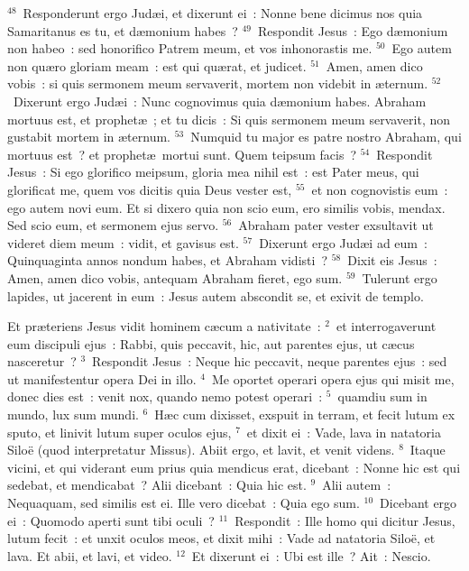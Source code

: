 ${}^{48}$~Responderunt ergo Jud\ae i, et dixerunt ei~: Nonne bene dicimus nos quia Samaritanus es tu, et d\ae monium habes~?
${}^{49}$~Respondit Jesus~: Ego d\ae monium non habeo~: sed honorifico Patrem meum, et vos inhonorastis me.
${}^{50}$~Ego autem non qu\ae ro gloriam meam~: est qui qu\ae rat, et judicet.
${}^{51}$~Amen, amen dico vobis~: si quis sermonem meum servaverit, mortem non videbit in \ae ternum.
${}^{52}$~Dixerunt ergo Jud\ae i~: Nunc cognovimus quia d\ae monium habes. Abraham mortuus est, et prophet\ae~; et tu dicis~: Si quis sermonem meum servaverit, non gustabit mortem in \ae ternum.
${}^{53}$~Numquid tu major es patre nostro Abraham, qui mortuus est~? et prophet\ae\ mortui sunt. Quem teipsum facis~?
${}^{54}$~Respondit Jesus~: Si ego glorifico meipsum, gloria mea nihil est~: est Pater meus, qui glorificat me, quem vos dicitis quia Deus vester est,
${}^{55}$~et non cognovistis eum~: ego autem novi eum. Et si dixero quia non scio eum, ero similis vobis, mendax. Sed scio eum, et sermonem ejus servo.
${}^{56}$~Abraham pater vester exsultavit ut videret diem meum~: vidit, et gavisus est.
${}^{57}$~Dixerunt ergo Jud\ae i ad eum~: Quinquaginta annos nondum habes, et Abraham vidisti~?
${}^{58}$~Dixit eis Jesus~: Amen, amen dico vobis, antequam Abraham fieret, ego sum.
${}^{59}$~Tulerunt ergo lapides, ut jacerent in eum~: Jesus autem abscondit se, et exivit de templo.

\lettrine[lines=3,image=true,loversize=0.05,lraise=-0.03]{E}{}t pr\ae teriens Jesus vidit hominem c\ae cum a nativitate~:
${}^{2}$~et interrogaverunt eum discipuli ejus~: Rabbi, quis peccavit, hic, aut parentes ejus, ut c\ae cus nasceretur~?
${}^{3}$~Respondit Jesus~: Neque hic peccavit, neque parentes ejus~: sed ut manifestentur opera Dei in illo.
${}^{4}$~Me oportet operari opera ejus qui misit me, donec dies est~: venit nox, quando nemo potest operari~:
${}^{5}$~quamdiu sum in mundo, lux sum mundi.
${}^{6}$~H\ae c cum dixisset, exspuit in terram, et fecit lutum ex sputo, et linivit lutum super oculos ejus,
${}^{7}$~et dixit ei~: Vade, lava in natatoria Silo\"e (quod interpretatur Missus). Abiit ergo, et lavit, et venit videns.
${}^{8}$~Itaque vicini, et qui viderant eum prius quia mendicus erat, dicebant~: Nonne hic est qui sedebat, et mendicabat~? Alii dicebant~: Quia hic est.
${}^{9}$~Alii autem~: Nequaquam, sed similis est ei. Ille vero dicebat~: Quia ego sum.
${}^{10}$~Dicebant ergo ei~: Quomodo aperti sunt tibi oculi~?
${}^{11}$~Respondit~: Ille homo qui dicitur Jesus, lutum fecit~: et unxit oculos meos, et dixit mihi~: Vade ad natatoria Silo\"e, et lava. Et abii, et lavi, et video.
${}^{12}$~Et dixerunt ei~: Ubi est ille~? Ait~: Nescio.


